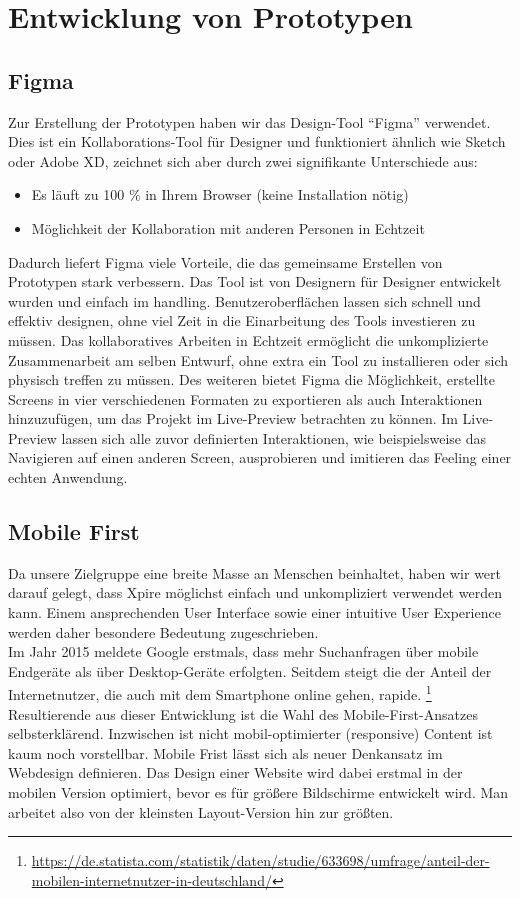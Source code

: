 \section{Entwicklung von Prototypen}
\subsection{Figma}
Zur Erstellung der Prototypen haben wir das Design-Tool \enquote{Figma} verwendet. Dies ist ein Kollaborations-Tool für Designer und funktioniert ähnlich wie Sketch oder Adobe XD, zeichnet sich aber durch zwei signifikante Unterschiede aus\autocite[vgl.][]{?}:
\begin{itemize}[noitemsep]
	\item Es läuft zu 100 \% in Ihrem Browser (keine Installation nötig)
	\item Möglichkeit der Kollaboration mit anderen Personen in Echtzeit
\end{itemize}
Dadurch liefert Figma viele Vorteile, die das gemeinsame Erstellen von Prototypen stark verbessern. Das Tool ist von Designern für Designer entwickelt wurden und einfach im handling. Benutzeroberflächen lassen sich schnell und effektiv designen, ohne viel Zeit in die Einarbeitung des Tools investieren zu müssen. Das kollaboratives Arbeiten in Echtzeit ermöglicht die unkomplizierte Zusammenarbeit am selben Entwurf, ohne extra ein Tool zu installieren oder sich physisch treffen zu müssen. Des weiteren bietet Figma die Möglichkeit, erstellte Screens in vier verschiedenen Formaten zu exportieren als auch Interaktionen hinzuzufügen, um das Projekt im Live-Preview betrachten zu können. Im Live-Preview lassen sich alle zuvor definierten Interaktionen, wie beispielsweise das Navigieren auf einen anderen Screen, ausprobieren und imitieren das Feeling einer echten Anwendung.

\subsection{Mobile First}
Da unsere Zielgruppe eine breite Masse an Menschen beinhaltet, haben wir wert darauf gelegt, dass Xpire möglichst einfach und unkompliziert verwendet werden kann. Einem ansprechenden User Interface sowie einer intuitive User Experience werden daher besondere Bedeutung zugeschrieben.\\
Im Jahr 2015 meldete Google erstmals, dass mehr Suchanfragen über mobile Endgeräte als über Desktop-Geräte erfolgten. Seitdem steigt die der Anteil der Internetnutzer, die auch mit dem Smartphone online gehen, rapide. \footnote{\url{https://de.statista.com/statistik/daten/studie/633698/umfrage/anteil-der-mobilen-internetnutzer-in-deutschland/}} Resultierende aus dieser Entwicklung ist die Wahl des Mobile-First-Ansatzes selbsterklärend. Inzwischen ist nicht mobil-optimierter (responsive) Content ist kaum noch vorstellbar. Mobile Frist lässt sich als neuer Denkansatz im Webdesign definieren. Das Design einer Website wird dabei erstmal in der mobilen Version optimiert, bevor es für größere Bildschirme entwickelt wird. Man arbeitet also von der kleinsten Layout-Version hin zur größten.\autocite[vgl.][]{?}

